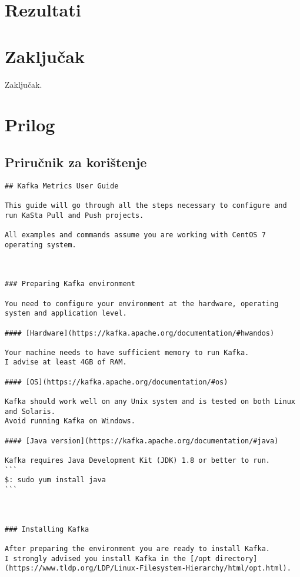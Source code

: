 \documentclass[times, utf8, diplomski, numeric]{fer}
\begin{document}
\chapter{Rezultati}

\chapter{Zaključak}
Zaključak.

\chapter{Prilog}

\section{Priručnik za korištenje}
\begin{lstlisting}[breaklines]
## Kafka Metrics User Guide

This guide will go through all the steps necessary to configure and run KaSta Pull and Push projects.  

All examples and commands assume you are working with CentOS 7 operating system.



### Preparing Kafka environment

You need to configure your environment at the hardware, operating system and application level.  

#### [Hardware](https://kafka.apache.org/documentation/#hwandos)

Your machine needs to have sufficient memory to run Kafka.  
I advise at least 4GB of RAM.  

#### [OS](https://kafka.apache.org/documentation/#os)

Kafka should work well on any Unix system and is tested on both Linux and Solaris.  
Avoid running Kafka on Windows.  

#### [Java version](https://kafka.apache.org/documentation/#java)

Kafka requires Java Development Kit (JDK) 1.8 or better to run.  
```
$: sudo yum install java
```



### Installing Kafka

After preparing the environment you are ready to install Kafka.  
I strongly advised you install Kafka in the [/opt directory](https://www.tldp.org/LDP/Linux-Filesystem-Hierarchy/html/opt.html).  


\end{lstlisting}
\end{document}

